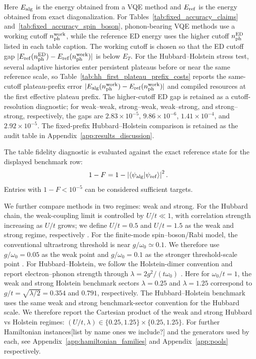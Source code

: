 \documentclass[
  reprint,
  amsmath,
  amssymb,
  aps,
  pra,
  nofootinbib,
  superscriptaddress,
  floatfix
]{revtex4-2}
\newcommand{\placeholder}[1]{\textcolor{red!70!black}{\ifmmode\left[#1\right]\else\textsf{[#1]}\fi}}
\newcommand{\braket}[2]{\langle #1|#2\rangle}
\begin{document}
Here $E_{\rm alg}$ is the energy obtained from a VQE method and $E_{\rm ref}$ is the energy obtained from exact diagonalization. For Tables~\ref{tab:fixed_accuracy_claims} and~\ref{tab:fixed_accuracy_spin_boson}, phonon-bearing VQE methods use a working cutoff \(n_{\rm ph}^{\rm work}\), while the reference ED energy uses the higher cutoff \(n_{\rm ph}^{\rm ED}\) listed in each table caption. The working cutoff is chosen so that the ED cutoff gap \(|E_{\rm ref}(n_{\rm ph}^{\rm ED})-E_{\rm ref}(n_{\rm ph}^{\rm work})|\) is below \(E_T\). For the Hubbard--Holstein stress test, several adaptive histories enter persistent plateaus before or near the same reference scale, so Table~\ref{tab:hh_first_plateau_prefix_costs} reports the same-cutoff plateau-prefix error \(|E_{\rm alg}(n_{\rm ph}^{\rm work})-E_{\rm ref}(n_{\rm ph}^{\rm work})|\) and compiled resources at the first effective plateau prefix. The higher-cutoff ED gap is retained as a cutoff-resolution diagnostic; for weak--weak, strong--weak, weak--strong, and strong--strong, respectively, the gaps are \(2.83\times10^{-5}\), \(9.86\times10^{-6}\), \(1.41\times10^{-4}\), and \(2.92\times10^{-5}\). The fixed-prefix Hubbard--Holstein comparison is retained as the audit table in Appendix~\ref{app:results_discussion}.

The table fidelity diagnostic is evaluated against the exact reference state for the displayed benchmark row:
\begin{equation}
1-F=1-\left|\braket{\psi_{\rm alg}}{\psi_{\rm ref}}\right|^2 .
\label{eq:fidelity_diagnostic}
\end{equation}
Entries with \(1-F<10^{-5}\) can be considered sufficient targets.

We further compare methods in two regimes: weak and strong. For the Hubbard chain, the weak-coupling limit is controlled by
\(U/t\ll 1\), with correlation strength increasing as \(U/t\) grows;
we define \(U/t=0.5\) and \(U/t=1.5\) as the weak and strong regime, respectively
\cite{Arovas2022Hubbard}.  
For the finite-mode spin--boson/Rabi model, the conventional ultrastrong
threshold is near \(g/\omega_0\simeq 0.1\).  We therefore use
\(g/\omega_0=0.05\) as the weak point and \(g/\omega_0=0.1\) as the
stronger threshold-scale point
\cite{Kockum2019Ultrastrong,FornDiaz2019Ultrastrong}.
For Hubbard--Holstein, we follow the Holstein-dimer convention and report electron--phonon strength through \(\lambda=2g^2/(t\omega_0)\) \cite{Sakkinen2015HolsteinDimer}.  Here for
\(\omega_0/t=1\), the weak and strong Holstein benchmark sectors
\(\lambda=0.25\) and \(\lambda=1.25\) correspond to
\(g/t=\sqrt{\lambda/2}=0.354\) and \(0.791\), respectively.  The
Hubbard--Holstein benchmark uses the same weak and strong benchmark-sector convention for the Hubbard scale. We therefore report the Cartesian product of the weak and strong Hubbard vs Holstein regimes:
\((U/t,\lambda)\in\{0.25,1.25\}\times\{0.25,1.25\}\).
For further Hamiltonian instances\placeholder{list by name ones we include?} and the generators used by each, see Appendix~\ref{app:hamiltonian_families} and Appendix~\ref{app:pools} respectively. 
\end{document}
